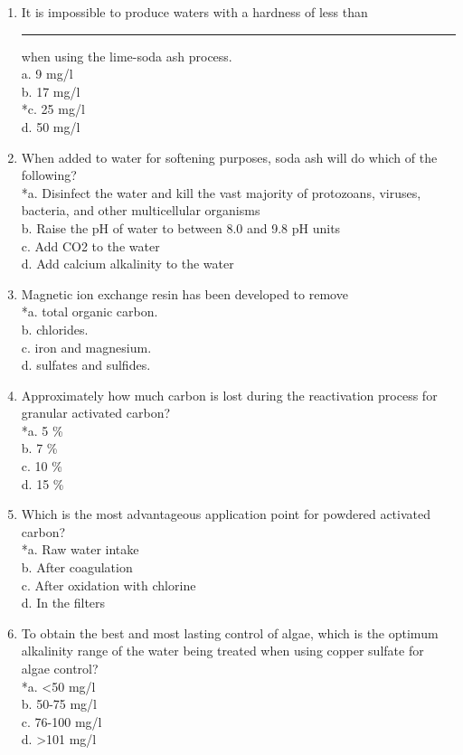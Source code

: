 \begin{enumerate}
 \item It is impossible to produce waters with a hardness of less than \rule{01.5cm}{0.5pt} when using the lime-soda ash process.\\
a. 9 mg/l\\
b. 17 mg/l \\
*c. 25 mg/l \\
d. 50 mg/l \\
  \item When added to water for softening purposes, soda ash will do which of the following?\\
*a. Disinfect the water and kill the vast majority of protozoans, viruses, bacteria, and other multicellular organisms\\
b. Raise the pH of water to between 8.0 and 9.8 pH units\\
c. Add CO2 to the water\\
d. Add calcium alkalinity to the water\\
  \item Magnetic ion exchange resin has been developed to remove\\
*a. total organic carbon.\\
b. chlorides.\\
c. iron and magnesium.\\
d. sulfates and sulfides. 
  \item Approximately how much carbon is lost during the reactivation process for granular activated carbon?\\
*a. 5 \%\\
b. 7 \%\\
c. 10 \%\\
d. 15 \%\\
  \item Which is the most advantageous application point for powdered activated carbon?\\
*a. Raw water intake\\
b. After coagulation\\
c. After oxidation with chlorine\\
d. In the filters\\


  \item To obtain the best and most lasting control of algae, which is the optimum alkalinity range of the water being treated when using copper sulfate for algae control?\\
*a. <50 mg/l\\
b.  50-75 mg/l\\
c.  76-100 mg/l\\
d.  >101 mg/l\\


\end{enumerate}

